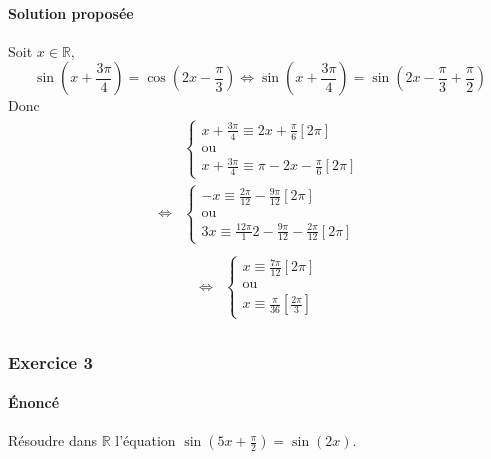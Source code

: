 \documentclass[10pt]{article}
\newcommand{\pr}[1]{\left(#1\right)}
\def\R{\mathbb R}
\def\ssi{\Leftrightarrow}
\def\Ssi{\Longleftrightarrow}
\begin{document}
    \paragraph{Solution proposée} Soit $x\in\R$, \[\sin\pr{x+\frac{3\pi}4}=\cos\pr{2x-\frac\pi3}\ssi \sin\pr{x+\frac{3\pi}4}=\sin\pr{2x-\frac\pi3+\frac\pi2}\]
    Donc
    \begin{align*}
        &\begin{cases}x+\frac{3\pi}4\equiv 2x+\frac\pi6[2\pi]\\ \text{ou}\\x+\frac{3\pi}4\equiv\pi- 2x-\frac\pi6[2\pi] \end{cases}\\
        \Ssi&\begin{cases}-x\equiv\frac{2\pi}{12}-\frac{9\pi}{12}[2\pi]\\ \text{ou}\\3x\equiv\frac{12\pi}12-\frac{9\pi}{12}-\frac{2\pi}{12}[2\pi] \end{cases}\\
    \end{align*}
    \newpage
    \begin{align*}
        \Ssi&\begin{cases}x\equiv\frac{7\pi}{12}[2\pi]\\ \text{ou}\\x\equiv\frac\pi{36}\left[\frac{2\pi}3\right] \end{cases}\\
    \end{align*}

    \subsubsection*{Exercice 3}
    \paragraph{Énoncé} Résoudre dans $\R$ l'équation $\sin\pr{5x+\frac\pi2}=\sin(2x)$.
\end{document}
